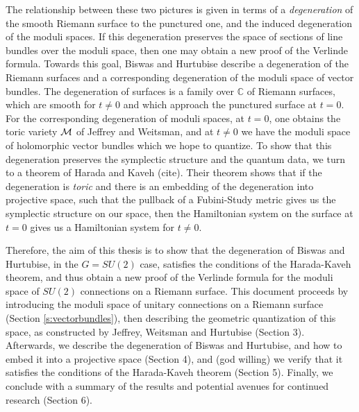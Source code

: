 	The relationship between these two pictures is given in terms of a \textit{degeneration} of the smooth Riemann surface to the punctured one, and the induced degeneration of the moduli spaces. If this degeneration preserves the space of sections of line bundles over the moduli space, then one may obtain a new proof of the Verlinde formula. Towards this goal, Biswas and Hurtubise describe a degeneration of the Riemann surfaces and a corresponding degeneration of the moduli space of vector bundles. The degeneration of surfaces is a family over $\mathbb{C}$ of Riemann surfaces, which are smooth for $t\neq0$ and which approach the punctured surface at $t=0$. For the corresponding degeneration of moduli spaces, at $t=0$, one obtains the toric variety $\mathcal{M}$ of Jeffrey and Weitsman, and at $t\neq 0$ we have the moduli space of holomorphic vector bundles which we hope to quantize. To show that this degeneration preserves the symplectic structure and the quantum data, we turn to a theorem of Harada and Kaveh (cite). Their theorem shows that if the degeneration is \textit{toric} and there is an embedding of the degeneration into projective space, such that the pullback of a Fubini-Study metric gives us the symplectic structure on our space, then the Hamiltonian system on the surface at $t=0$ gives us a Hamiltonian system for $t\neq 0$. 
	
	Therefore, the aim of this thesis is to show that the degeneration of Biswas and Hurtubise, in the $G=SU(2)$ case, satisfies the conditions of the Harada-Kaveh theorem, and thus obtain a new proof of the Verlinde formula for the moduli space of $SU(2)$ connections on a Riemann surface. This document proceeds by introducing the moduli space of unitary connections on a Riemann surface (Section \ref{s:vectorbundles}), then describing the geometric quantization of this space, as constructed by Jeffrey, Weitsman and Hurtubise (Section 3). Afterwards, we describe the degeneration of Biswas and Hurtubise, and how to embed it into a projective space (Section 4), and (god willing) we verify that it satisfies the conditions of the Harada-Kaveh theorem (Section 5). Finally, we conclude with a summary of the results and potential avenues for continued research (Section 6).

